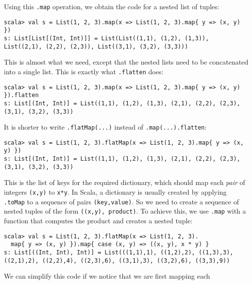 Using this \lstinline!.map!
operation, we obtain the code for a nested list of tuples:
\begin{lstlisting}
scala> val s = List(1, 2, 3).map(x => List(1, 2, 3).map{ y => (x, y) })
s: List[List[(Int, Int)]] = List(List((1,1), (1,2), (1,3)), List((2,1), (2,2), (2,3)), List((3,1), (3,2), (3,3)))
\end{lstlisting}
This is almost what we need, except that the nested lists need to
be concatenated into a single list. This is exactly what \lstinline!.flatten!
does:
\begin{lstlisting}
scala> val s = List(1, 2, 3).map(x => List(1, 2, 3).map{ y => (x, y) }).flatten
s: List[(Int, Int)] = List((1,1), (1,2), (1,3), (2,1), (2,2), (2,3), (3,1), (3,2), (3,3))
\end{lstlisting}
It is shorter to write \lstinline!.flatMap(...)!
instead of \lstinline!.map(...).flatten!:
\begin{lstlisting}
scala> val s = List(1, 2, 3).flatMap(x => List(1, 2, 3).map{ y => (x, y) })
s: List[(Int, Int)] = List((1,1), (1,2), (1,3), (2,1), (2,2), (2,3), (3,1), (3,2), (3,3)) 
\end{lstlisting}
This is the list of keys for the required dictionary, which should
map each \emph{pair} of integers \lstinline!(x,y)!
to \lstinline!x*y!. In
Scala, a dictionary is usually created by applying \lstinline!.toMap!
to a sequence of pairs \lstinline!(key,value)!.
So we need to create a sequence of nested tuples of the form \lstinline!((x,y), product)!.
To achieve this, we use \lstinline!.map!
with a function that computes the product and creates a nested tuple:
\begin{lstlisting}
scala> val s = List(1, 2, 3).flatMap(x => List(1, 2, 3).
  map{ y => (x, y) }).map{ case (x, y) => ((x, y), x * y) }
s: List[((Int, Int), Int)] = List(((1,1),1), ((1,2),2), ((1,3),3), ((2,1),2), ((2,2),4), ((2,3),6), ((3,1),3), ((3,2),6), ((3,3),9))
\end{lstlisting}
We can simplify this code if we notice that we are first mapping each

